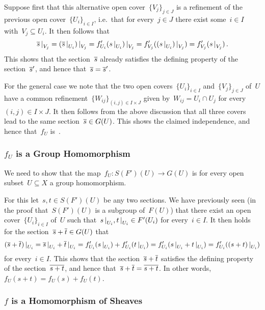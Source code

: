 Suppose first that this alternative open cover~$\{ V_j \}_{j \in J}$ is a refinement of the previous open cover~$\{ U_i \}_{i \in I}$, i.e.\ that for every~$j \in J$ there exist some~$i \in I$ with~$V_j \subseteq U_i$.
It then follows that
\[
    \restrict{ \induced{s} }{V_j}
  = \restrict{ (\restrict{\induced{s}}{U_i}) }{V_j}
  = \restrict{ f'_{U_i}(\restrict{s}{U_i}) }{V_j}
  = f'_{V_j}( \restrict{ (\restrict{s}{U_i}) }{V_j} )
  = f'_{V_j}( \restrict{ s }{V_j} ) \,.
\]
This shows that the section~$\overline{s}$ already satisfies the defining property of the section~$\overline{s}'$, and hence that~$\overline{s} = \overline{s}'$.

For the general case we note that the two open covers~$\{ U_i \}_{i \in I}$ and~$\{ V_j \}_{j \in J}$ of~$U$ have a common refinement~$\{ W_{ij} \}_{(i,j) \in I \times J}$ given by~$W_{ij} = U_i \cap U_j$ for every~$(i,j) \in I \times J$.
It then follows from the above discussion that all three covers lead to the same section~$\overline{s} \in G(U)$.
This shows the claimed independence, and hence that~$f_U$ is~{\welldef}.



\subsubsection*{$f_U$ is a Group Homomorphism}

We need to show that the map~$f_U \colon S(F')(U) \to G(U)$ is for every open subset~$U \subseteq X$ a group homomorphism.

For this let~$s, t \in S(F')(U)$ be any two sections.
We have previously seen (in the proof that~$S(F')(U)$ is a subgroup of~$F(U)$) that there exist an open cover~$\{ U_i \}_{i \in I}$ of~$U$ such that~$\restrict{s}{U_i}, \restrict{t}{U_i} \in F'(U_i)$ for every~$i \in I$.
It then holds for the section~$\overline{s} + \overline{t} \in G(U)$ that
\[
    \restrict{(\induced{s} + \induced{t})}{U_i}
  = \restrict{\induced{s}}{U_i} + \restrict{\induced{t}}{U_i}
  = f'_{U_i}(\restrict{s}{U_i}) + f'_{U_i}(\restrict{t}{U_i})
  = f'_{U_i}( \restrict{s}{U_i} + \restrict{t}{U_i} )
  = f'_{U_i}( \restrict{(s + t)}{U_i} )
\]
for every~$i \in I$.
This shows that the section~$\overline{s} + \overline{t}$ satisfies the defining property of the section~$\overline{s+t}$, and hence that~$\overline{s} + \overline{t} = \overline{s + t}$.
In other words,~$f_U(s + t) = f_U(s) + f_U(t)$.



\subsubsection*{$f$ is a Homomorphism of Sheaves}

